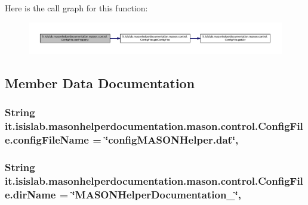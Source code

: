 Here is the call graph for this function\-:
\nopagebreak
\begin{figure}[H]
\begin{center}
\leavevmode
\includegraphics[width=350pt]{classit_1_1isislab_1_1masonhelperdocumentation_1_1mason_1_1control_1_1_config_file_a29d4bd9c148d1d7576cef7bcaf796172_cgraph}
\end{center}
\end{figure}




\subsection{Member Data Documentation}
\hypertarget{classit_1_1isislab_1_1masonhelperdocumentation_1_1mason_1_1control_1_1_config_file_a46a4e9d3359f002ff462e19976987878}{
\subsubsection[{config\-File\-Name}]{\setlength{\rightskip}{0pt plus 5cm}String it.\-isislab.\-masonhelperdocumentation.\-mason.\-control.\-Config\-File.\-config\-File\-Name = \char`\"{}config\-M\-A\-S\-O\-N\-Helper.\-dat\char`\"{}\hspace{0.3cm}{\ttfamily [static]}, {\ttfamily [private]}}}\label{classit_1_1isislab_1_1masonhelperdocumentation_1_1mason_1_1control_1_1_config_file_a46a4e9d3359f002ff462e19976987878}
\hypertarget{classit_1_1isislab_1_1masonhelperdocumentation_1_1mason_1_1control_1_1_config_file_a7d8bbffdbfca146a398ed0bba454f347}{
\subsubsection[{dir\-Name}]{\setlength{\rightskip}{0pt plus 5cm}String it.\-isislab.\-masonhelperdocumentation.\-mason.\-control.\-Config\-File.\-dir\-Name = \char`\"{}M\-A\-S\-O\-N\-Helper\-Documentation\-\_\-\char`\"{}\hspace{0.3cm}{\ttfamily [static]}, {\ttfamily [private]}}}\label{classit_1_1isislab_1_1masonhelperdocumentation_1_1mason_1_1control_1_1_config_file_a7d8bbffdbfca146a398ed0bba454f347}
